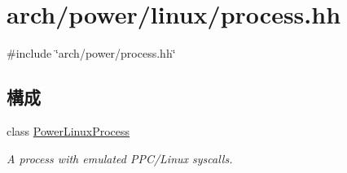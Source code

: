 \hypertarget{arch_2power_2linux_2process_8hh}{
\section{arch/power/linux/process.hh}
\label{arch_2power_2linux_2process_8hh}
}
{\ttfamily \#include \char`\"{}arch/power/process.hh\char`\"{}}\par
\subsection*{構成}
\begin{DoxyCompactItemize}
\item 
class \hyperlink{classPowerLinuxProcess}{PowerLinuxProcess}
\begin{DoxyCompactList}\small\item\em A process with emulated PPC/Linux syscalls. \item\end{DoxyCompactList}\end{DoxyCompactItemize}
